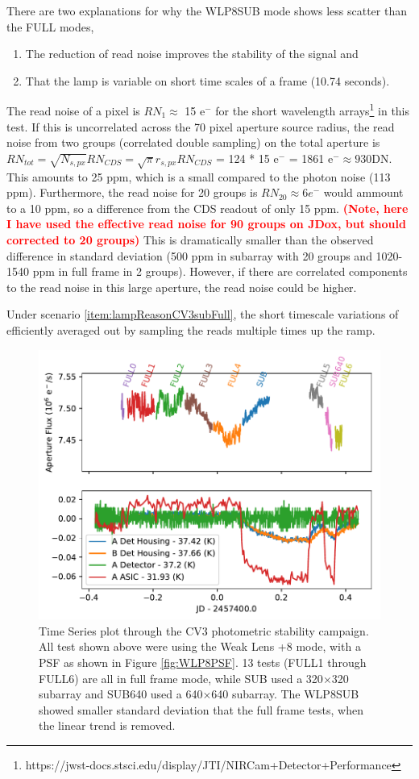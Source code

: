 \documentclass{aastex62}
\begin{document}
There are two explanations for why the WLP8SUB mode shows less scatter than the FULL modes, 
\begin{enumerate}[noitemsep]
	\item The reduction of read noise improves the stability of the signal and\label{item:readNReasonCV3subFull}
	\item That the lamp is variable on short time scales of a frame (10.74 seconds).\label{item:lampReasonCV3subFull}
\end{enumerate}
The read noise of a pixel is $RN_1 \approx$ 15 e$^-$ for the short wavelength arrays\footnote{https://jwst-docs.stsci.edu/display/JTI/NIRCam+Detector+Performance} in this test.
If this is uncorrelated across the 70 pixel aperture source radius, the read noise from two groups  (correlated double sampling) on the total aperture is $RN_{tot} = \sqrt{N_{s,px}} RN_{CDS} = \sqrt{\pi} r_{s,px} RN_{CDS}$ = 124 * 15 e$^-$ = 1861 e$^- \approx 930 $DN.
This amounts to 25 ppm, which is a small compared to the photon noise (113 ppm).
Furthermore, the read noise for 20 groups is $RN_{20} \approx 6e^-$ would ammount to a 10 ppm, so a difference from the CDS readout of only 15 ppm. {\textbf{\textcolor{red}{(Note, here I have used the effective read noise for 90 groups on JDox, but should corrected to 20 groups)}}}
This is dramatically smaller than the observed difference in standard deviation (500 ppm in subarray with 20 groups and 1020-1540 ppm in full frame in 2 groups).
However, if there are correlated components to the read noise in this large aperture, the read noise could be higher.

Under scenario \ref{item:lampReasonCV3subFull}, the short timescale variations of efficiently averaged out by sampling the reads multiple times up the ramp.

\begin{figure}[!hbtp]
\centering
\includegraphics[width=.79\columnwidth]{plot_mmm.pdf}
\caption{Time Series plot through the CV3 photometric stability campaign.
All test shown above were using the Weak Lens +8 mode, with a PSF as shown in Figure \ref{fig:WLP8PSF}.
13 tests (FULL1 through FULL6) are all in full frame mode, while SUB used a 320$\times$320 subarray and SUB640 used a 640$\times$640 subarray.
The WLP8SUB showed smaller standard deviation that the full frame tests, when the linear trend is removed.}\label{fig:CV3longTser}
\end{figure}
\end{document}
